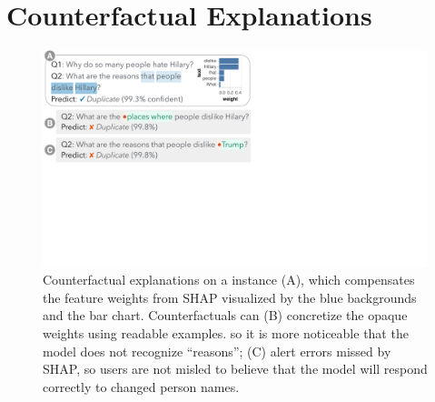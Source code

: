 
\newcommand{\fwone}[1]{\colbox{cfwone}{#1}\xspace}
\newcommand{\fwtwo}[1]{\colbox{cfwtwo}{#1}\xspace}
\newcommand{\fwthree}[1]{\colbox{cfwthree}{#1}\xspace}
\newcommand{\fwfour}[1]{\colbox{cfwfour}{#1}\xspace}

\newcommand{\fexp}[2]{\texttt{[{\color{darkgray}{#1:#2}}]}\xspace}
\newcommand{\fexptag}[1]{\fexp{TAG}{#1}}
\newcommand{\fexpfrom}[1]{\fexp{FROM}{#1}}
\newcommand{\fexpto}[1]{\fexp{TO}{#1}}
\newcommand{\fexptemp}[1]{\fexp{TEMP}{#1}}


\section{Counterfactual Explanations}
\label{sec:app_explain}






\begin{figure}[t]
\centering
\includegraphics[trim={0 18cm 31cm 0cm},clip,width=1\columnwidth]{figures/explanation_v2}
\vspace{-15pt}
\caption{
Counterfactual explanations on a \qqp instance (A), which compensates the feature weights from SHAP visualized by the blue backgrounds and the bar chart.
Counterfactuals can 
(B) concretize the opaque weights using readable examples. so it is more noticeable that the model does not recognize ``reasons'';
(C) alert errors missed by SHAP, so users are not misled to believe that the model will respond correctly to changed person names.
}
\vspace{-10pt}
\label{fig:explanation}
\end{figure}

